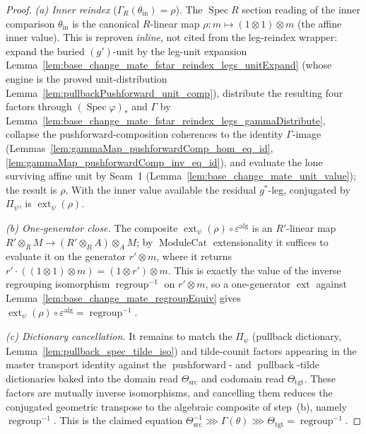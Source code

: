 \begin{proof}
  \emph{(a) Inner reindex} (\(\Gamma_R(\theta_{\mathrm{in}}) = \rho\)). The \(\operatorname{Spec} R\)
  section reading of the inner comparison \(\theta_{\mathrm{in}}\) is the canonical \(R\)-linear map
  \(\rho : m \mapsto (1 \otimes 1) \otimes m\) (the affine inner value). This is reproven
  \emph{inline}, not cited from the leg-reindex wrapper: expand the buried \((g')\)-unit by the
  leg-unit expansion Lemma~\ref{lem:base_change_mate_fstar_reindex_legs_unitExpand} (whose engine is
  the proved unit-distribution Lemma~\ref{lem:pullbackPushforward_unit_comp}), distribute the
  resulting four factors through \((\operatorname{Spec}\varphi)_*\) and \(\Gamma\) by
  Lemma~\ref{lem:base_change_mate_fstar_reindex_legs_gammaDistribute}, collapse the
  pushforward-composition coherences to the identity \(\Gamma\)-image
  (Lemmas~\ref{lem:gammaMap_pushforwardComp_hom_eq_id},
  \ref{lem:gammaMap_pushforwardComp_inv_eq_id}), and evaluate the lone surviving affine unit by
  Seam~1 (Lemma~\ref{lem:base_change_mate_unit_value}); the result is \(\rho\). With the inner value
  available the residual \(g^*\)-leg, conjugated by \(\Pi_{\psi}\), is
  \(\operatorname{ext}_\psi(\rho)\).

  \emph{(b) One-generator close.} The composite
  \(\operatorname{ext}_\psi(\rho) \circ \varepsilon^{\mathrm{alg}}\) is an \(R'\)-linear map
  \(R' \otimes_R M \to (R' \otimes_R A) \otimes_A M\); by \(\operatorname{ModuleCat}\)
  extensionality it suffices to evaluate it on the generator \(r' \otimes m\), where it returns
  \(r' \cdot ((1 \otimes 1) \otimes m) = (1 \otimes r') \otimes m\). This is exactly the value of the
  inverse regrouping isomorphism \(\operatorname{regroup}^{-1}\) on \(r' \otimes m\), so a
  one-generator \(\operatorname{ext}\) against Lemma~\ref{lem:base_change_mate_regroupEquiv} gives
  \(\operatorname{ext}_\psi(\rho) \circ \varepsilon^{\mathrm{alg}} = \operatorname{regroup}^{-1}\).

  \emph{(c) Dictionary cancellation.} It remains to match the \(\Pi_{\psi}\) (pullback dictionary,
  Lemma~\ref{lem:pullback_spec_tilde_iso}) and tilde-counit factors appearing in the master
  transport identity against the \(\operatorname{pushforward}\)- and \(\operatorname{pullback}\)-tilde
  dictionaries baked into the domain read \(\Theta_{\mathrm{src}}\) and codomain read
  \(\Theta_{\mathrm{tgt}}\). These factors are mutually inverse isomorphisms, and cancelling them
  reduces the conjugated geometric transpose to the algebraic composite of step~(b), namely
  \(\operatorname{regroup}^{-1}\). This is the claimed equation
  \(\Theta_{\mathrm{src}}^{-1} \ggg \Gamma(\theta) \ggg \Theta_{\mathrm{tgt}}
  = \operatorname{regroup}^{-1}\).
\end{proof}

